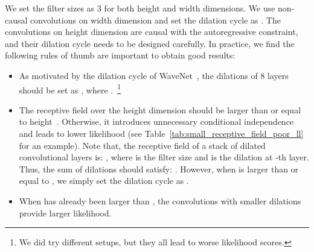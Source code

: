 \documentclass{article}
\begin{document}
We set the filter sizes as 3 for both height and width dimensions.
We use non-causal convolutions on width dimension and set the dilation cycle as .
The convolutions on height dimension are causal with the autoregressive constraint, 
and their dilation cycle needs to be designed carefully. In practice, we find the following rules of thumb are important to obtain good results:
\begin{itemize}[noitemsep,topsep=0pt, leftmargin=1.75em]
    \vspace{-0.1cm}
    \item As motivated by the dilation cycle of WaveNet~\citep{oord2016wavenet}, the dilations of 8 layers should be set as , where .~\footnote{We did try different setups, but they all lead to worse likelihood scores.}
\item The receptive field  over the height dimension should be larger than or equal to height~. Otherwise, it introduces unnecessary conditional independence and leads to lower likelihood (see Table~\ref{tab:small_receptive_field_poor_ll} for an example). 
    Note that, the receptive field of a stack of dilated convolutional layers is: , where  is the filter size and  is the dilation at -th layer. Thus, the sum of dilations should satisfy: .
    However, when  is larger than or equal to , we simply set the dilation cycle as .
\item When  has already been larger than , the convolutions with smaller dilations provide larger likelihood.
    \vspace{-.2em}
\end{itemize}
\end{document}
